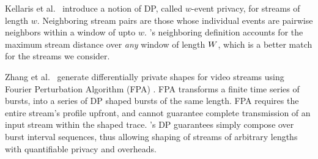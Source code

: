 Kellaris et al.~\cite{kellaris2014differentially} introduce a notion of DP,
called $w$-event privacy, for streams of length $w$.
Neighboring stream pairs are those whose individual events are pairwise
neighbors within a window of upto $w$.
{\sys}'s neighboring definition accounts for the maximum stream distance over
{\em any} window of length $W$, which is a better match for the streams
we consider.

Zhang et al.~\cite{zhang2019statistical} generate differentially private shapes
for video streams using Fourier Perturbation Algorithm (FPA)
\cite{rastogi2010differentially}.
FPA transforms a finite time series of bursts, into a series of DP shaped bursts
of the same length.
FPA requires the entire stream's profile upfront, and cannot guarantee complete
transmission of an input stream within the shaped trace.
{\sys}'s DP guarantees simply compose over burst interval sequences, thus
allowing shaping of streams of arbitrary lengths with
quantifiable privacy and overheads.







